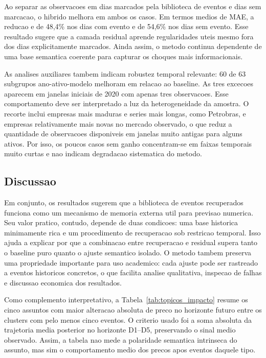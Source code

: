 \documentclass[12pt]{article}
\begin{document}
Ao separar as observacoes em dias marcados pela biblioteca de eventos e dias sem marcacao, o hibrido melhora em ambos os casos. Em termos medios de MAE, a reducao e de 48,4\% nos dias com evento e de 54,6\% nos dias sem evento. Esse resultado sugere que a camada residual aprende regularidades uteis mesmo fora dos dias explicitamente marcados. Ainda assim, o metodo continua dependente de uma base semantica coerente para capturar os choques mais informacionais.

As analises auxiliares tambem indicam robustez temporal relevante: 60 de 63 subgrupos ano-ativo-modelo melhoram em relacao ao baseline. As tres excecoes aparecem em janelas iniciais de 2020 com apenas tres observacoes. Esse comportamento deve ser interpretado a luz da heterogeneidade da amostra. O recorte inclui empresas mais maduras e series mais longas, como Petrobras, e empresas relativamente mais novas no mercado observado, o que reduz a quantidade de observacoes disponiveis em janelas muito antigas para alguns ativos. Por isso, os poucos casos sem ganho concentram-se em faixas temporais muito curtas e nao indicam degradacao sistematica do metodo.

\subsection{Discussao}

Em conjunto, os resultados sugerem que a biblioteca de eventos recuperados funciona como um mecanismo de memoria externa util para previsao numerica. Seu valor pratico, contudo, depende de duas condicoes: uma base historica minimamente rica e um procedimento de recuperacao sob restricao temporal. Isso ajuda a explicar por que a combinacao entre recuperacao e residual supera tanto o baseline puro quanto o ajuste semantico isolado. O metodo tambem preserva uma propriedade importante para uso academico: cada ajuste pode ser rastreado a eventos historicos concretos, o que facilita analise qualitativa, inspecao de falhas e discussao economica dos resultados.

Como complemento interpretativo, a Tabela~\ref{tab:topicos_impacto} resume os cinco assuntos com maior alteracao absoluta de preco no horizonte futuro entre os clusters com pelo menos cinco eventos. O criterio usado foi a soma absoluta da trajetoria media posterior no horizonte D1--D5, preservando o sinal medio observado. Assim, a tabela nao mede a polaridade semantica intrinseca do assunto, mas sim o comportamento medio dos precos apos eventos daquele tipo.
\end{document}
